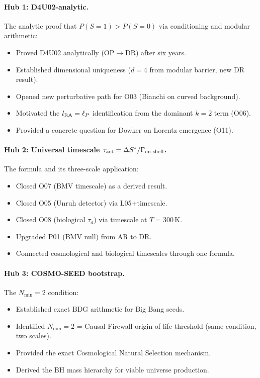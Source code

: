 \documentclass[12pt,a4paper]{article}
\begin{document}
\paragraph{Hub 1: D4U02-analytic.}  The analytic proof that $P(S=1)>P(S=0)$ via conditioning and modular arithmetic:
\begin{itemize}
  \item Proved D4U02 analytically (OP$\to$DR) after six years.
  \item Established dimensional uniqueness ($d=4$ from modular barrier, new DR result).
  \item Opened new perturbative path for O03 (Bianchi on curved background).
  \item Motivated the $l_{\rm RA}=\ell_P$ identification from the dominant $k=2$ term (O06).
  \item Provided a concrete question for Dowker on Lorentz emergence (O11).
\end{itemize}

\paragraph{Hub 2: Universal timescale $\tau_{\rm act}=\Delta S^*/\Gamma_{\rm on\text{-}shell}$.}  The formula and its three-scale application:
\begin{itemize}
  \item Closed O07 (BMV timescale) as a derived result.
  \item Closed O05 (Unruh detector) via L05+timescale.
  \item Closed O08 (biological $\tau_d$) via timescale at $T=300\,\mathrm{K}$.
  \item Upgraded P01 (BMV null) from AR to DR.
  \item Connected cosmological and biological timescales through one formula.
\end{itemize}

\paragraph{Hub 3: COSMO-SEED bootstrap.}  The $N_{\min}=2$ condition:
\begin{itemize}
  \item Established exact BDG arithmetic for Big Bang seeds.
  \item Identified $N_{\min}=2$ = Causal Firewall origin-of-life threshold (same condition, two scales).
  \item Provided the exact Cosmological Natural Selection mechanism.
  \item Derived the BH mass hierarchy for viable universe production.
\end{itemize}
\end{document}
